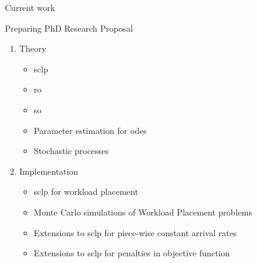 \documentclass[pdf]{beamer}
\theoremstyle{definition}
\begin{document}
\begin{frame}{Current work}

    Preparing PhD Research Proposal

    \begin{enumerate}
        \item Theory

        \begin{itemize}
            \item \Gls{sclp}
            \item \Gls{ro}
            \item \Gls{so}
            \item Parameter estimation for \Glspl{ode}
            \item Stochastic processes
        \end{itemize}

        \item Implementation
        \begin{itemize}
            \item \Gls{sclp} for workload placement
            \item Monte Carlo simulations of Workload Placement problems
            \item Extensions to \gls{sclp} for piece-wise constant arrival rates
            \item Extensions to \gls{sclp} for penalties in objective function
        \end{itemize}

    \end{enumerate}

\end{frame}
\end{document}
